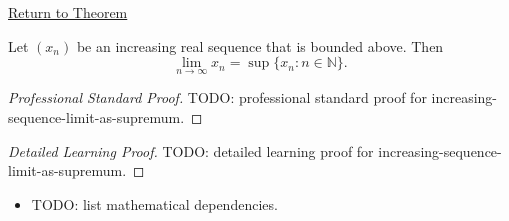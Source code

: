 \newpage
{}
\label{prf:increasing-sequence-limit-as-supremum}

\begin{remark*}[Return]
\hyperref[thm:increasing-sequence-limit-as-supremum]{Return to Theorem}
\end{remark*}

\begin{theorem*}
Let $(x_n)$ be an increasing real sequence that is bounded above. Then
\[
  \lim_{n\to\infty}x_n=\sup\{x_n:n\in\mathbb{N}\}.
\]

\smallskip
\noindent
\end{theorem*}

\begin{proof}[Professional Standard Proof]
\LRAProofBodyStart
TODO: professional standard proof for increasing-sequence-limit-as-supremum.
\end{proof}

\begin{proof}[Detailed Learning Proof]
\LRAProofBodyStart
TODO: detailed learning proof for increasing-sequence-limit-as-supremum.
\end{proof}

\begin{remark*}
\end{remark*}

\begin{dependencies}
\begin{itemize}
  \item TODO: list mathematical dependencies.
\end{itemize}
\end{dependencies}

\clearpage
